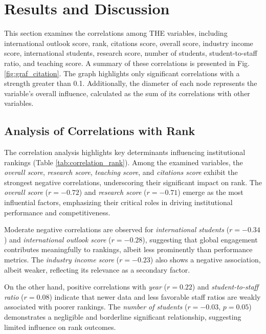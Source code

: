 \documentclass[conference]{IEEEtran}
\begin{document}
\section{Results and Discussion}
This section examines the correlations among THE variables, including international outlook score, rank, citations score, overall score, industry income score, international students, research score, number of students, student-to-staff ratio, and teaching score. A summary of these correlations is presented in Fig. \ref{fig:graf_citation}. The graph highlights only significant correlations with a strength greater than 0.1. Additionally, the diameter of each node represents the variable's overall influence, calculated as the sum of its correlations with other variables.



\subsection{Analysis of Correlations with Rank}

The correlation analysis highlights key determinants influencing institutional rankings (Table \ref{tab:correlation_rank}). Among the examined variables, the \textit{overall score}, \textit{research score}, \textit{teaching score}, and \textit{citations score} exhibit the strongest negative correlations, underscoring their significant impact on rank. The \textit{overall score} ($r = -0.72$) and \textit{research score} ($r = -0.71$) emerge as the most influential factors, emphasizing their critical roles in driving institutional performance and competitiveness.

Moderate negative correlations are observed for \textit{international students} ($r = -0.34$) and \textit{international outlook score} ($r = -0.28$), suggesting that global engagement contributes meaningfully to rankings, albeit less prominently than performance metrics. The \textit{industry income score} ($r = -0.23$) also shows a negative association, albeit weaker, reflecting its relevance as a secondary factor.

On the other hand, positive correlations with \textit{year} ($r = 0.22$) and \textit{student-to-staff ratio} ($r = 0.08$) indicate that newer data and less favorable staff ratios are weakly associated with poorer rankings. The \textit{number of students} ($r = -0.03$, $p = 0.05$) demonstrates a negligible and borderline significant relationship, suggesting limited influence on rank outcomes.
\end{document}
